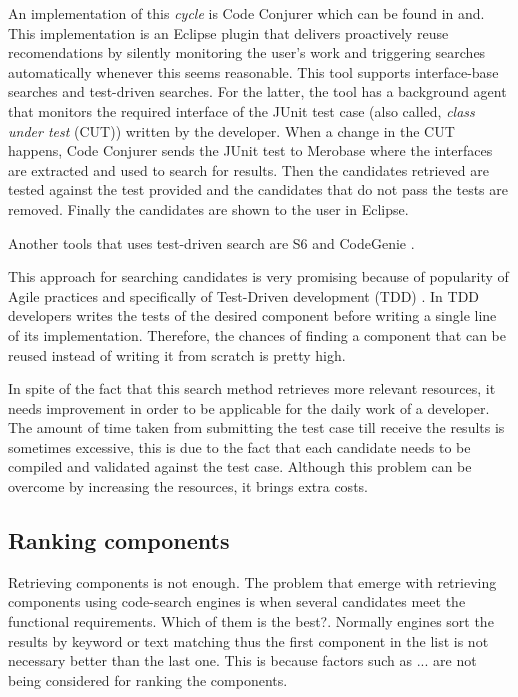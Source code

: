 An implementation of this \textit{cycle} is Code Conjurer which can be found in \cite{Hummel2008} and\cite{Hummel2013}. This implementation is an Eclipse plugin that delivers proactively reuse recomendations by silently monitoring the user's work and triggering searches automatically whenever this seems reasonable. This tool supports interface-base searches and test-driven searches. For the latter, the tool has a background agent that monitors the required interface of the JUnit test case (also called, \textit{class under test} (CUT)) written by the developer. When a change in the CUT happens, Code Conjurer sends the JUnit test to Merobase where the interfaces are extracted and used to search for results. Then the candidates retrieved are tested against the test provided and the candidates that do not pass the tests are removed. Finally the candidates are shown to the user in Eclipse.

Another tools that uses test-driven search are S6 \cite{Reiss2009} and CodeGenie \cite{Lemos2007}.

This approach for searching candidates is very promising because of popularity of Agile practices and specifically of Test-Driven development (TDD) \cite{Beck2003}. In TDD developers writes the tests of the desired component before writing a single line of its implementation. Therefore, the chances of finding a component that can be reused instead of writing it from scratch is pretty high.

In spite of the fact that this search method retrieves more relevant resources, it needs improvement in order to be applicable for the daily work of a developer. The amount of time taken from submitting the test case till receive the results is sometimes excessive, this is due to the fact that each candidate needs to be compiled and validated against the test case. Although this problem can be overcome by increasing the resources, it brings extra costs. 

\subsection{Ranking components}
Retrieving components is not enough. The problem that emerge with retrieving components using code-search engines is when several candidates meet the functional requirements. Which of them is the best?. Normally engines sort the results by keyword or text matching thus the first component in the list is not necessary better than the last one. This is because factors such as ... are not being considered for ranking the components.

